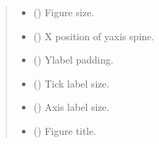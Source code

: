 \documentclass[letterpaper,10pt,english]{sphinxhowto}
\begin{document}
\begin{fulllineitems}
\begin{quote}
\begin{description}
\begin{itemize}
\item {} 
\sphinxAtStartPar
{} (\sphinxstyleliteralemphasis{\sphinxupquote{, }}\sphinxstyleliteralemphasis{\sphinxupquote{(}}\sphinxstyleliteralemphasis{\sphinxupquote{, }}\sphinxstyleliteralemphasis{\sphinxupquote{)}}) \textendash{} Figure size.

\item {} 
\sphinxAtStartPar
{} (\sphinxstyleliteralemphasis{\sphinxupquote{, }}) \textendash{} X position of y\sphinxhyphen{}axis spine.

\item {} 
\sphinxAtStartPar
{} (\sphinxstyleliteralemphasis{\sphinxupquote{, }}) \textendash{} Y\sphinxhyphen{}label padding.

\item {} 
\sphinxAtStartPar
{} (\sphinxstyleliteralemphasis{\sphinxupquote{, }}) \textendash{} Tick label size.

\item {} 
\sphinxAtStartPar
{} (\sphinxstyleliteralemphasis{\sphinxupquote{, }}) \textendash{} Axis label size.

\item {} 
\sphinxAtStartPar
{} (\sphinxstyleliteralemphasis{\sphinxupquote{, }}) \textendash{} Figure title.


\end{itemize}
\end{description}
\end{quote}
\end{fulllineitems}
\end{document}
